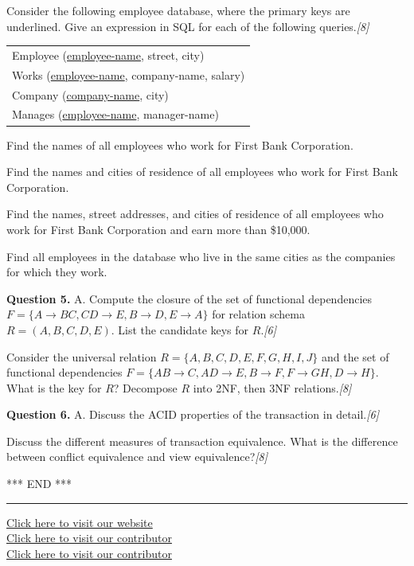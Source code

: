 \documentclass[11pt,a4paper]{article}
\newcommand{\pts}[1]{\hfill\textit{[#1]}}
\begin{document}
\begin{parts}
  \item Consider the following employee database, where the primary keys are underlined. Give an expression in SQL for each of the following queries.\pts{8}
  \begin{center}
    \begin{tabular}{l}
      Employee (\underline{employee-name}, street, city) \\
      Works (\underline{employee-name}, company-name, salary) \\
      Company (\underline{company-name}, city) \\
      Manages (\underline{employee-name}, manager-name)
    \end{tabular}
  \end{center}
  \begin{parts}
    \item Find the names of all employees who work for First Bank Corporation.
    \item Find the names and cities of residence of all employees who work for First Bank Corporation.
    \item Find the names, street addresses, and cities of residence of all employees who work for First Bank Corporation and earn more than \$10,000.
    \item Find all employees in the database who live in the same cities as the companies for which they work.
  \end{parts}
\end{parts}

\medskip\noindent\textbf{Question 5.} A. Compute the closure of the set of functional dependencies $F = \{A \to BC, CD \to E, B \to D, E \to A\}$ for relation schema $R = (A, B, C, D, E)$. List the candidate keys for $R$.\pts{6}
\begin{parts}
  \item Consider the universal relation $R = \{A, B, C, D, E, F, G, H, I, J\}$ and the set of functional dependencies $F = \{AB \to C, AD \to E, B \to F, F \to GH, D \to H\}$. What is the key for $R$? Decompose $R$ into 2NF, then 3NF relations.\pts{8}
\end{parts}

\medskip\noindent\textbf{Question 6.} A. Discuss the ACID properties of the transaction in detail.\pts{6}
\begin{parts}
  \item Discuss the different measures of transaction equivalence. What is the difference between conflict equivalence and view equivalence?\pts{8}
\end{parts}
\centerline{*** END ***}

\vfill
\rule{\linewidth}{0.4pt}
\begin{center}\small
\href{https://bhu-exam.vercel.app/}{Click here to visit our website}\\[4pt]\href{https://me-aryan.vercel.app/}{Click here to visit our contributor}\\[4pt]\href{https://quashan-me.vercel.app/}{Click here to visit our contributor}
\end{center}
\end{document}
